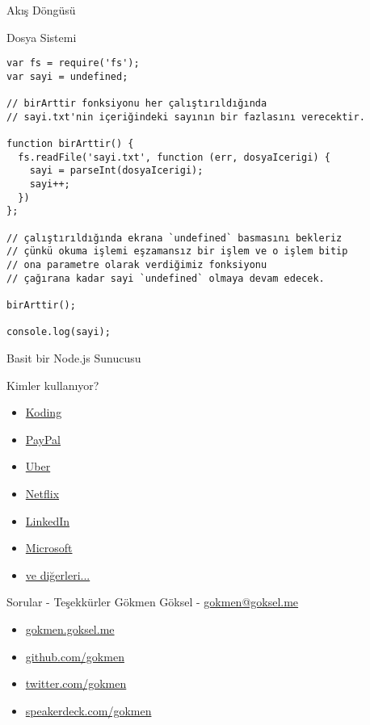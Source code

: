 \documentclass[xcolor=dvipsnames]{beamer}
\begin{document}
\begin{frame}{Akış Döngüsü}
    \centering{}
\end{frame}

\begin{frame}[fragile]{Dosya Sistemi}
\centering
\begin{verbatim}
var fs = require('fs');
var sayi = undefined;

// birArttir fonksiyonu her çalıştırıldığında
// sayi.txt'nin içeriğindeki sayının bir fazlasını verecektir.

function birArttir() {
  fs.readFile('sayi.txt', function (err, dosyaIcerigi) {
    sayi = parseInt(dosyaIcerigi);
    sayi++;
  })
};

// çalıştırıldığında ekrana `undefined` basmasını bekleriz
// çünkü okuma işlemi eşzamansız bir işlem ve o işlem bitip
// ona parametre olarak verdiğimiz fonksiyonu
// çağırana kadar sayi `undefined` olmaya devam edecek.

birArttir();

console.log(sayi);
\end{verbatim}
\end{frame}

\begin{frame}{Basit bir Node.js Sunucusu}
    \centering{}
\end{frame}

\begin{frame}{Kimler kullanıyor?}
\begin{itemize}
    \item {\href{https://koding.com}{Koding}}
    \item {\href{https://paypal.com}{PayPal}}
    \item {\href{https://uber.com}{Uber}}
    \item {\href{https://netflix.com}{Netflix}}
    \item {\href{https://linkedin.com}{LinkedIn}}
    \item {\href{https://microsoft.com}{Microsoft}}
    \item {\href{https://github.com/nodejs/node-v0.x-archive/wiki/Projects,-Applications,-and-Companies-Using-Node}{ve diğerleri...}}
\end{itemize}
\end{frame}

\begin{frame}{Sorular - Teşekkürler}
    \LARGE{{Gökmen Göksel - \url{gokmen@goksel.me}}}

\begin{itemize}
    \item {\href{https://gokmen.goksel.me}{gokmen.goksel.me}}
    \item {\href{https://github.com/gokmen}{github.com/gokmen}}
    \item {\href{https://twitter.com/gokmen}{twitter.com/gokmen}}
    \item {\href{https://speakerdeck.com/gokmen}{speakerdeck.com/gokmen}}
\end{itemize}
\end{frame}
\end{document}
